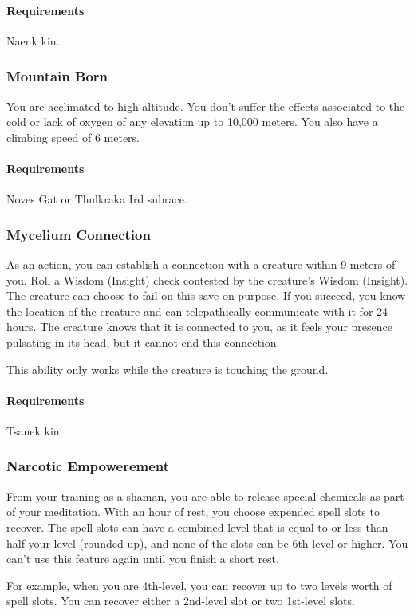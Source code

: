     \paragraph{Requirements} Naenk kin.
\subsubsection{Mountain Born} \label{feat::mountainborn}
    You are acclimated to high altitude.
    You don't suffer the effects associated to the cold or lack of oxygen of any elevation up to 10,000 meters.
    You also have a climbing speed of 6 meters.
    \paragraph{Requirements} Noves Gat or Thulkraka Ird subrace.
\subsubsection{Mycelium Connection} \label{feat::myceliumconnection}
    As an action, you can establish a connection with a creature within 9 meters of you.
    Roll a Wisdom (Insight) check contested by the creature's Wisdom (Insight).
    The creature can choose to fail on this save on purpose.
    If you succeed, you know the location of the creature and can telepathically communicate with it for 24 hours.
    The creature knows that it is connected to you, as it feels your presence pulsating in its head, but it cannot end this connection.

    This ability only works while the creature is touching the ground.
    \paragraph{Requirements} Tsanek kin.
\subsubsection{Narcotic Empowerement} \label{feat::narcoticempowerement}
    From your training as a shaman, you are able to release special chemicals as part of your meditation.
    With an hour of rest, you choose expended spell slots to recover.
    The spell slots can have a combined level that is equal to or less than half your level (rounded up), and none of the slots can be 6th level or higher.
    You can't use this feature again until you finish a short rest.

    For example, when you are 4th-level, you can recover up to two levels worth of spell slots.
    You can recover either a 2nd-level slot or two 1st-level slots.
